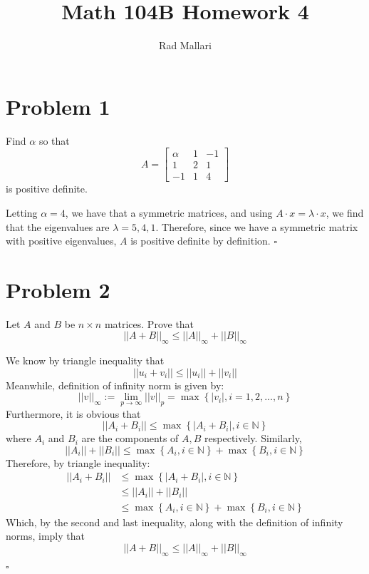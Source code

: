 \documentclass[11pt]{article}
\title{Math 104B Homework 4}
\author{Rad Mallari}
\newcommand{\N}{\mathbb{N}}
\newcommand{\set}[1]{\left\{ #1\right\}}
\newenvironment{proof}{\noindent{\bf Proof.}}{\hfill $\square$\medskip}
\begin{document}
\maketitle

\section{Problem 1}
Find $\alpha$ so that
$$A=\begin{bmatrix}
        \alpha & 1 & -1 \\
        1      & 2 & 1  \\
        -1     & 1 & 4
    \end{bmatrix}$$
is positive definite.

\begin{proof}
Letting $\alpha=4$, we have that a symmetric matrices, and using $A\cdot x=\lambda\cdot x$,
we find that the eigenvalues are $\lambda=5,4,1$. Therefore, since we have a symmetric matrix
with positive eigenvalues, $A$ is positive definite by definition.
\end{proof}

\section{Problem 2}
Let $A$ and $B$ be $n\times n$ matrices. Prove that
$$||A+B||_{\infty}\leq||A||_{\infty}+||B||_{\infty}$$

\begin{proof}
We know by triangle inequality that 
$$||u_{i}+v_{i}||\leq||u_{i}||+||v_{i}||$$
Meanwhile, definition of infinity norm is given by:
$$||v||_{\infty}:=\lim_{p\to\infty}||v||_{p}=\max\set{|v_{i}|,i=1,2,...,n}$$
Furthermore, it is obvious that
$$||A_{i}+B_{i}||\leq\max\set{|A_{i}+B_{i}|,i\in\N}$$
where $A_{i}$ and $B_{i}$ are the components of $A,B$ respectively. Similarly,
$$||A_{i}||+||B_{i}||\leq \max\set{A_{i},i\in\N}+\max\set{B_{i},i\in\N}$$
Therefore, by triangle inequality:
\begin{equation}
    \begin{split}
        ||A_{i}+B_{i}||&\leq\max\set{|A_{i}+B_{i}|,i\in\N}\\
        &\leq||A_{i}||+||B_{i}||\\
        &\leq\max\set{A_{i},i\in\N}+\max\set{B_{i},i\in\N}
    \end{split}
\end{equation}
Which, by the second and last inequality, along with the definition of infinity norms,
imply that
$$||A+B||_{\infty}\leq||A||_{\infty}+||B||_{\infty}$$

\end{proof}
\end{document}
